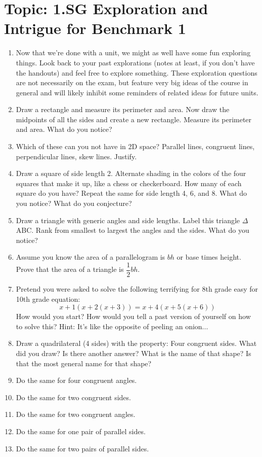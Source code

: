 \documentclass[12pt,letterpaper]{article}
\begin{document}
\section*{Topic: 1.SG Exploration and Intrigue for Benchmark 1}
\begin{enumerate}
    \item Now that we're done with a unit, we might as well have some fun exploring things. Look back to your past explorations (notes at least, if you don't have the handouts) and feel free to explore something. These exploration questions are not necessarily on the exam, but feature very big ideas of the course in general and will likely inhibit some reminders of related ideas for future units.
    \item Draw a rectangle and measure its perimeter and area. Now draw the midpoints of all the sides and create a new rectangle. Measure its perimeter and area. What do you notice?
    \item Which of these can you not have in 2D space? Parallel lines, congruent lines, perpendicular lines, skew lines. Justify.
    \item Draw a square of side length 2. Alternate shading in the colors of the four squares that make it up, like a chess or checkerboard. How many of each square do you have? Repeat the same for side length 4, 6, and 8. What do you notice? What do you conjecture?
    \item Draw a triangle with generic angles and side lengths. Label this triangle $\Delta$ABC. Rank from smallest to largest the angles and the sides. What do you notice?
    \item Assume you know the area of a parallelogram is $bh$ or base times height. Prove that the area of a triangle is $\dfrac{1}{2}bh$.
    \item Pretend you were asked to solve the following terrifying for 8th grade easy for 10th grade equation: $$x+1(x+2(x+3))=x+4(x+5(x+6))$$ How would you start? How would you tell a past version of yourself on how to solve this? Hint: It's like the opposite of peeling an onion...
    \item Draw a quadrilateral (4 sides) with the property: Four congruent sides. What did you draw? Is there another answer? What is the name of that shape? Is that the most general name for that shape?
    \item Do the same for four congruent angles.
    \item Do the same for two congruent sides.
    \item Do the same for two congruent angles.
    \item Do the same for one pair of parallel sides.
    \item Do the same for two pairs of parallel sides.
\end{enumerate}
\end{document}
